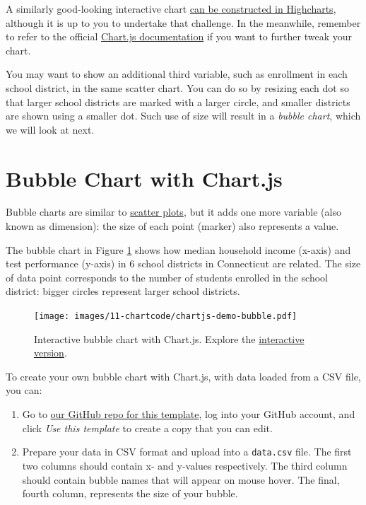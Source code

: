 \documentclass[
  english,
]{book}
\begin{document}
A similarly good-looking interactive chart \href{https://www.highcharts.com/demo/scatter}{can be constructed in Highcharts}, although it is up to you to undertake that challenge. In the meanwhile, remember to refer to the official \href{https://www.chartjs.org/docs/latest/}{Chart.js documentation} if you want to further tweak your chart.

You may want to show an additional third variable, such as enrollment in each school district, in the same scatter chart. You can do so by resizing each dot so that larger school districts are marked with a larger circle, and smaller districts are shown using a smaller dot. Such use of size will result in a \emph{bubble chart}, which we will look at next.

\hypertarget{chartjs-bubble}{%
\section*{Bubble Chart with Chart.js}\label{chartjs-bubble}}

Bubble charts are similar to \href{chartjs-scatter.html}{scatter plots}, but it adds one more variable (also known as dimension): the size of each point (marker) also represents a value.

The bubble chart in Figure \ref{fig:chartjs-demo-bubble} shows how median household income (x-axis) and test performance (y-axis) in 6 school districts in Connecticut are related. The size of data point corresponds to the number of students enrolled in the school district: bigger circles represent larger school districts.



\begin{figure}
\centering
\texttt{[image: images/11-chartcode/chartjs-demo-bubble.pdf]}
\caption{\label{fig:chartjs-demo-bubble}Interactive bubble chart with Chart.js. Explore the \href{https://handsondataviz.github.io/chartjs-bubble/}{interactive version}.}
\end{figure}

To create your own bubble chart with Chart.js, with data loaded from a CSV file, you can:

\begin{enumerate}
\def\labelenumi{\arabic{enumi}.}
\item
  Go to \href{https://github.com/HandsOnDataViz/chartjs-bubble}{our GitHub repo for this template}, log into your GitHub account, and click \emph{Use this template} to create a copy that you can edit.
\item
  Prepare your data in CSV format and upload into a \texttt{data.csv} file. The first two columns should contain x- and y-values respectively. The third column should contain bubble names that will appear on mouse hover. The final, fourth column, represents the size of your bubble.
\end{enumerate}
\end{document}
